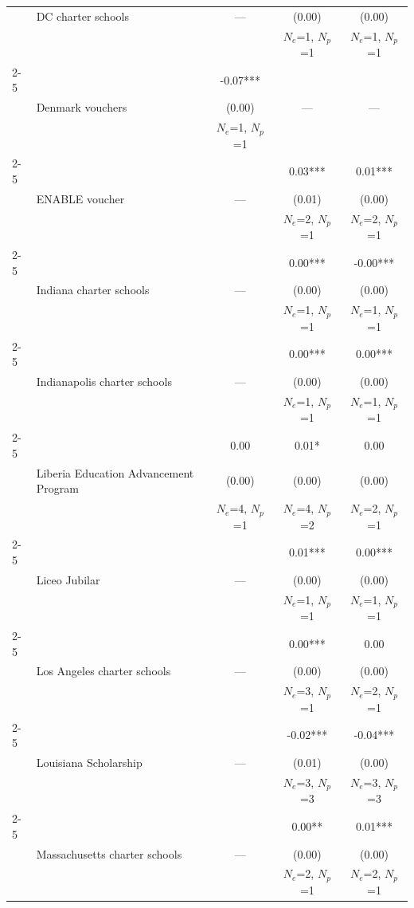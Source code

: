 \begin{longtable}{@{\extracolsep{\fill}} l l c c c @{}}
  & DC charter schools & --- & (0.00) & (0.00) \\
  &  &  & $N_e$=1, $N_p$=1 & $N_e$=1, $N_p$=1 \\
\cmidrule(lr){2-5}
  &  & -0.07*** &  &  \\
  & Denmark vouchers & (0.00) & --- & --- \\
  &  & $N_e$=1, $N_p$=1 &  &  \\
\cmidrule(lr){2-5}
  &  &  & 0.03*** & 0.01*** \\
  & ENABLE voucher & --- & (0.01) & (0.00) \\
  &  &  & $N_e$=2, $N_p$=1 & $N_e$=2, $N_p$=1 \\
\cmidrule(lr){2-5}
  &  &  & 0.00*** & -0.00*** \\
  & Indiana charter schools & --- & (0.00) & (0.00) \\
  &  &  & $N_e$=1, $N_p$=1 & $N_e$=1, $N_p$=1 \\
\cmidrule(lr){2-5}
  &  &  & 0.00*** & 0.00*** \\
  & Indianapolis charter schools & --- & (0.00) & (0.00) \\
  &  &  & $N_e$=1, $N_p$=1 & $N_e$=1, $N_p$=1 \\
\cmidrule(lr){2-5}
  &  & 0.00 & 0.01* & 0.00 \\
  & Liberia Education Advancement Program & (0.00) & (0.00) & (0.00) \\
  &  & $N_e$=4, $N_p$=1 & $N_e$=4, $N_p$=2 & $N_e$=2, $N_p$=1 \\
\cmidrule(lr){2-5}
  &  &  & 0.01*** & 0.00*** \\
  & Liceo Jubilar & --- & (0.00) & (0.00) \\
  &  &  & $N_e$=1, $N_p$=1 & $N_e$=1, $N_p$=1 \\
\cmidrule(lr){2-5}
  &  &  & 0.00*** & 0.00 \\
  & Los Angeles charter schools & --- & (0.00) & (0.00) \\
  &  &  & $N_e$=3, $N_p$=1 & $N_e$=2, $N_p$=1 \\
\cmidrule(lr){2-5}
  &  &  & -0.02*** & -0.04*** \\
  & Louisiana Scholarship & --- & (0.01) & (0.00) \\
  &  &  & $N_e$=3, $N_p$=3 & $N_e$=3, $N_p$=3 \\
\cmidrule(lr){2-5}
  &  &  & 0.00** & 0.01*** \\
  & Massachusetts charter schools & --- & (0.00) & (0.00) \\
  &  &  & $N_e$=2, $N_p$=1 & $N_e$=2, $N_p$=1 \\

\end{longtable}
